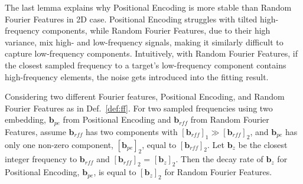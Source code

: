 The last lemma explains why Positional Encoding is more stable than Random Fourier Features in 2D case. 
%
Positional Encoding struggles with tilted high-frequency components, while Random Fourier Features, due to their high variance, mix high- and low-frequency signals, making it similarly difficult to capture low-frequency components.
%
Intuitively, with Random Fourier Features, if the closest sampled frequency to a target's low-frequency component contains high-frequency elements, the noise gets introduced into the fitting result.
\begin{lemma}
    Considering two different Fourier features, Positional Encoding, and Random Fourier Features as in Def.~\ref{def:ff}.
    For two sampled frequencies using two embedding, $\mathbf{b}_{pe}$ from Positional Encoding and $\mathbf{b}_{rff}$ from Random Fourier Features, assume $\mathbf{b}_{rff}$ has two components with $[\mathbf{b}_{rff}]_1 \gg [\mathbf{b}_{rff}]_2$, and $\mathbf{b}_{pe}$ has only one non-zero component,  $[\mathbf{b}_{pe}]_2$, equal to $[\mathbf{b}_{rff}]_2$. 
    Let $\mathbf{b}_z$ be the closest integer frequency to $\mathbf{b}_{rff}$ and $[\mathbf{b}_{rff}]_2$ = $[\mathbf{b}_z]_2$.
    Then the decay rate of $\mathbf{b}_z$ for Positional Encoding, $\mathbf{b}_{pe}$, is equal to $[\mathbf{b}_z]_2$ for Random Fourier Features.
\end{lemma}
